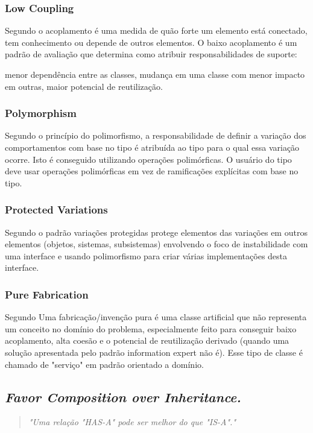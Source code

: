 \documentclass[12pt]{article}
\begin{document}
\subsubsection{Low Coupling} \label{sec:grasp}

Segundo \cite{CRAIG_LARMAN} o acoplamento é uma medida de quão forte um elemento está conectado, tem conhecimento ou depende de outros elementos. O baixo acoplamento é um padrão de avaliação que determina como atribuir responsabilidades de suporte:

menor dependência entre as classes,
mudança em uma classe com menor impacto em outras,
maior potencial de reutilização.

\subsubsection{Polymorphism} \label{sec:grasp}

Segundo \cite{CRAIG_LARMAN} o princípio do polimorfismo, a responsabilidade de definir a variação dos comportamentos com base no tipo é atribuída ao tipo para o qual essa variação ocorre. Isto é conseguido utilizando operações polimórficas. O usuário do tipo deve usar operações polimórficas em vez de ramificações explícitas com base no tipo.


\subsubsection{Protected Variations} \label{sec:grasp}

Segundo \cite{CRAIG_LARMAN} o padrão variações protegidas protege elementos das variações em outros elementos (objetos, sistemas, subsistemas) envolvendo o foco de instabilidade com uma interface e usando polimorfismo para criar várias implementações desta interface.

\subsubsection{Pure Fabrication} \label{sec:grasp}

Segundo \cite{CRAIG_LARMAN} Uma fabricação/invenção pura é uma classe artificial que não representa um conceito no domínio do problema, especialmente feito para conseguir baixo acoplamento, alta coesão e o potencial de reutilização derivado (quando uma solução apresentada pelo padrão information expert não é). Esse tipo de classe é chamado de "serviço" em padrão orientado a domínio.


\subsection{\textit{Favor Composition over Inheritance.}} \label{sec:favor_composition}
\begin{quote}
\textit{"Uma relação "HAS-A" pode ser melhor do que "IS-A"."}\cite{HEADFIRST_DESIGN_PATTERN}
\end{quote}
\end{document}
